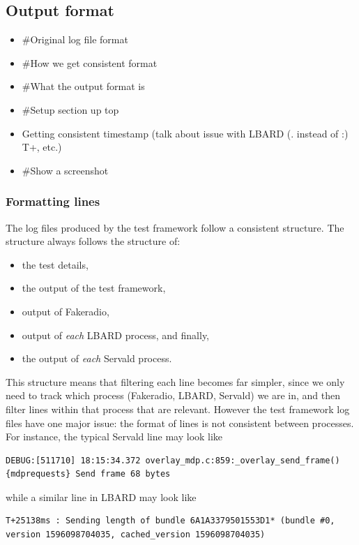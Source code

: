 \subsection{Output format}
\begin{itemize}
    \item \#Original log file format
    \item \#How we get consistent format
    \item \#What the output format is
    \item \#Setup section up top
    \item Getting consistent timestamp (talk about issue with LBARD (. instead of :) T+, etc.)
    \item \#Show a screenshot
\end{itemize}

\subsubsection{Formatting lines}
The log files produced by the test framework follow a consistent structure.
The structure always follows the structure of:
\begin{itemize}
    \item the test details, 
    \item the output of the test framework, 
    \item output of Fakeradio, 
    \item output of \emph{each} LBARD process, and finally,
    \item the output of \emph{each} Servald process.
\end{itemize} 

This structure means that filtering each line becomes far simpler, since we only need to track which process (Fakeradio, LBARD, Servald) we are in, and then filter lines within that process that are relevant.
However the test framework log files have one major issue: the format of lines is not consistent between processes.
For instance, the typical Servald line may look like
\begin{center}
    \begin{lstlisting}[breaklines]
DEBUG:[511710] 18:15:34.372 overlay_mdp.c:859:_overlay_send_frame()  {mdprequests} Send frame 68 bytes    
    \end{lstlisting}
\end{center}
while a similar line in LBARD may look like 

\begin{center}
    \begin{lstlisting}[breaklines]
T+25138ms : Sending length of bundle 6A1A3379501553D1* (bundle #0, version 1596098704035, cached_version 1596098704035)
    \end{lstlisting}
\end{center}


